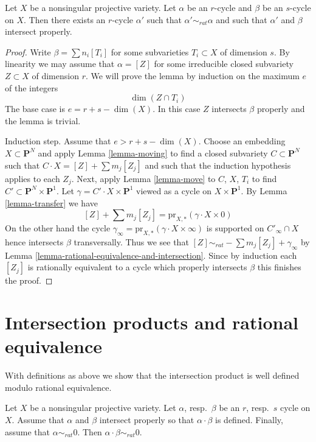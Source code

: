 \begin{lemma}
\label{lemma-moving-move}
Let $X$ be a nonsingular projective variety. Let $\alpha$ be an
$r$-cycle and $\beta$ be an $s$-cycle on $X$. Then there exists
an $r$-cycle $\alpha'$ such that $\alpha' \sim_{rat} \alpha$ and
such that $\alpha'$ and $\beta$ intersect properly.
\end{lemma}

\begin{proof}
Write $\beta = \sum n_i[T_i]$ for some subvarieties $T_i \subset X$
of dimension $s$. By linearity we may assume that $\alpha = [Z]$ for
some irreducible closed subvariety $Z \subset X$ of dimension $r$.
We will prove the lemma by induction on the maximum $e$ of the integers
$$
\dim(Z \cap T_i)
$$
The base case is $e = r + s - \dim(X)$. In this case $Z$ intersects
$\beta$ properly and the lemma is trivial.

\medskip\noindent
Induction step. Assume that $e > r + s - \dim(X)$. Choose an embedding
$X \subset \mathbf{P}^N$ and apply Lemma \ref{lemma-moving} to find a
closed subvariety $C \subset \mathbf{P}^N$ such that
$C \cdot X = [Z] + \sum m_j[Z_j]$ and such that the induction
hypothesis applies to each $Z_j$. Next, apply Lemma \ref{lemma-move}
to $C$, $X$, $T_i$ to find $C' \subset \mathbf{P}^N \times \mathbf{P}^1$.
Let $\gamma = C' \cdot X \times \mathbf{P}^1$ viewed as a cycle
on $X \times \mathbf{P}^1$. By Lemma \ref{lemma-transfer} we have
$$
[Z] + \sum m_j[Z_j] = \text{pr}_{X, *}(\gamma \cdot X \times 0)
$$
On the other hand the cycle
$\gamma_\infty = \text{pr}_{X, *}(\gamma \cdot X \times \infty)$
is supported on $C'_\infty \cap X$ hence intersects $\beta$ transversally.
Thus we see that $[Z] \sim_{rat} - \sum m_j[Z_j] + \gamma_\infty$
by Lemma \ref{lemma-rational-equivalence-and-intersection}. Since by
induction each $[Z_j]$ is rationally equivalent to a cycle which properly
intersects $\beta$ this finishes the proof.
\end{proof}



\section{Intersection products and rational equivalence}
\label{section-intersections-and-rational-equivalence}

\noindent
With definitions as above we show that the intersection product
is well defined modulo rational equivalence.

\begin{theorem}
\label{theorem-well-defined}
Let $X$ be a nonsingular projective variety. Let $\alpha$, resp.\ $\beta$
be an $r$, resp.\ $s$ cycle on $X$. Assume that $\alpha$ and $\beta$
intersect properly so that $\alpha \cdot \beta$ is defined. Finally,
assume that $\alpha \sim_{rat} 0$. Then $\alpha \cdot \beta \sim_{rat} 0$.
\end{theorem}

